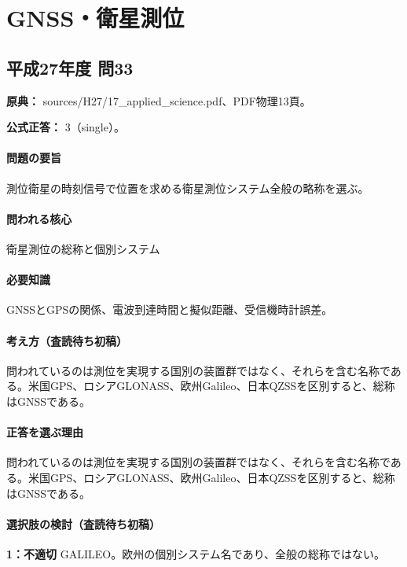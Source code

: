 \section{GNSS・衛星測位}

\subsection{平成27年度 問33}
\label{q:h27-reg-applied-33}

\noindent\textbf{原典：} sources/H27/17\_applied\_science.pdf、PDF物理13頁。

\textbf{公式正答：} 3（single）。

\paragraph{問題の要旨} 測位衛星の時刻信号で位置を求める衛星測位システム全般の略称を選ぶ。

\paragraph{問われる核心} 衛星測位の総称と個別システム

\paragraph{必要知識} GNSSとGPSの関係、電波到達時間と擬似距離、受信機時計誤差。

\paragraph{考え方（査読待ち初稿）} 問われているのは測位を実現する国別の装置群ではなく、それらを含む名称である。米国GPS、ロシアGLONASS、欧州Galileo、日本QZSSを区別すると、総称はGNSSである。

\paragraph{正答を選ぶ理由} 問われているのは測位を実現する国別の装置群ではなく、それらを含む名称である。米国GPS、ロシアGLONASS、欧州Galileo、日本QZSSを区別すると、総称はGNSSである。

\paragraph{選択肢の検討（査読待ち初稿）}\mbox{}\par

\noindent\textbf{1：不適切} GALILEO。欧州の個別システム名であり、全般の総称ではない。\par

